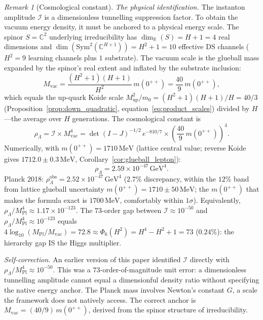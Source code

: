 \documentclass[11pt,a4paper]{article}
\theoremstyle{definition}
\theoremstyle{remark}
\newtheorem{remark}[theorem]{Remark}
\newcommand{\C}{\mathbb{C}}
\newcommand{\R}{\mathbb{R}}
\begin{document}
\begin{remark}[Cosmological constant]
\emph{The physical identification.} The instanton amplitude $\mathcal{I}$ is a dimensionless tunnelling suppression factor. To obtain the vacuum energy density, it must be anchored to a physical energy scale. The spinor $S=\C^2$ underlying irreducibility has $\dim_\R(S)=H+1=4$ real dimensions and $\dim(\mathrm{Sym}^2(\C^{H+1}))=H^2+1=10$ effective DS channels ($H^2=9$ learning channels plus $1$ substrate). The vacuum scale is the glueball mass expanded by the spinor's real extent and inflated by the substrate inclusion:
\begin{equation}\label{eq:M_vac}
M_{\mathrm{vac}} = \frac{(H^2+1)(H+1)}{H^2}\,m(0^{++}) = \frac{40}{9}\,m(0^{++}),
\end{equation}
which equals the up-quark Koide scale $M^2_{\mathrm{up}}/m_0=(H^2+1)(H+1)/H=40/3$ (Proposition~\ref{prop:down_quadratic}, equation~\ref{eq:product_scales}) divided by $H$---the average over $H$ generations. The cosmological constant is
\begin{equation}\label{eq:Lambda}
\rho_\Lambda = \mathcal{I}\times M_{\mathrm{vac}}^4 = \det(I\!-\!J)^{-1/2}\,e^{-810/7}\times\!\left(\frac{40}{9}\,m(0^{++})\right)^{\!4}.
\end{equation}
Numerically, with $m(0^{++})=1710\,\mathrm{MeV}$ (lattice central value; reverse Koide gives $1712.0\pm 0.3\,\mathrm{MeV}$, Corollary~\ref{cor:glueball_lepton}):
\[
\rho_\Lambda = 2.59\times 10^{-47}\,\mathrm{GeV}^4.
\]
Planck 2018: $\rho_\Lambda^{\mathrm{obs}}=2.52\times 10^{-47}\,\mathrm{GeV}^4$ ($2.7\%$ discrepancy, within the $12\%$ band from lattice glueball uncertainty $m(0^{++})=1710\pm 50\,\mathrm{MeV}$; the $m(0^{++})$ that makes the formula exact is $1700\,\mathrm{MeV}$, comfortably within $1\sigma$). Equivalently, $\rho_\Lambda/M_{\mathrm{Pl}}^4\approx 1.17\times 10^{-123}$. The $73$-order gap between $\mathcal{I}\approx 10^{-50}$ and $\rho_\Lambda/M_{\mathrm{Pl}}^4\approx 10^{-123}$ equals $4\log_{10}(M_{\mathrm{Pl}}/M_{\mathrm{vac}})=72.8\approx\Phi_6(H^2)=H^4-H^2+1=73$ ($0.24\%$): the hierarchy gap IS the Higgs multiplier.

\emph{Self-correction.} An earlier version of this paper identified $\mathcal{I}$ directly with $\rho_\Lambda/M_{\mathrm{Pl}}^4\approx 10^{-50}$. This was a $73$-order-of-magnitude unit error: a dimensionless tunnelling amplitude cannot equal a dimensionful density ratio without specifying the native energy anchor. The Planck mass involves Newton's constant $G$, a scale the framework does not natively access. The correct anchor is $M_{\mathrm{vac}}=(40/9)\,m(0^{++})$, derived from the spinor structure of irreducibility.


\end{remark}
\end{document}
